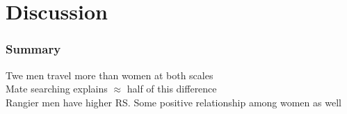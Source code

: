 \documentclass{beamer}
\begin{document}











\section{Discussion}


\begin{frame}
\frametitle{Summary}

Twe men travel more than women at both scales \\
\vspace{0.75cm}
Mate searching explains $\approx$ half of this difference \\
\vspace{0.75cm} 
Rangier men have higher RS. Some positive relationship among women as well \\

\end{frame}
\end{document}
